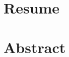 \thispagestyle{fancy}
\section*{Resume}
\label{sec:resume}

\section*{Abstract}
\label{sec:abstract}